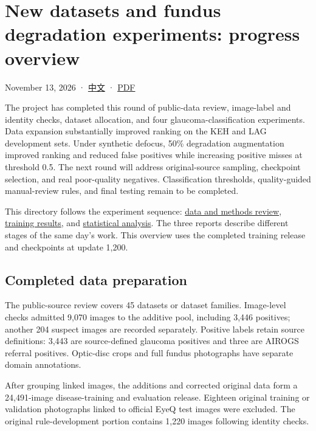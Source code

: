 \documentclass[
  10pt,
]{article}
\author{}
\date{}
\begin{document}
\section{New datasets and fundus degradation experiments: progress
overview}\label{new-datasets-and-fundus-degradation-experiments-progress-overview}

November 13, 2026 · \href{progress-overview.zh.md}{中文} ·
\href{progress-overview.en.pdf}{PDF}

The project has completed this round of public-data review, image-label
and identity checks, dataset allocation, and four
glaucoma-classification experiments. Data expansion substantially
improved ranking on the KEH and LAG development sets. Under synthetic
defocus, 50\% degradation augmentation improved ranking and reduced
false positives while increasing positive misses at threshold 0.5. The
next round will address original-source sampling, checkpoint selection,
and real poor-quality negatives. Classification thresholds,
quality-guided manual-review rules, and final testing remain to be
completed.

This directory follows the experiment sequence:
\href{data-review/data-and-degradation-review.en.md}{data and methods
review}, \href{training-results/training-results.en.md}{training
results}, and
\href{experimental-analysis/experimental-analysis.en.md}{statistical
analysis}. The three reports describe different stages of the same day's
work. This overview uses the completed training release and checkpoints
at update 1,200.

\subsection{Completed data
preparation}\label{completed-data-preparation}

The public-source review covers 45 datasets or dataset families.
Image-level checks admitted 9,070 images to the additive pool, including
3,446 positives; another 204 suspect images are recorded separately.
Positive labels retain source definitions: 3,443 are source-defined
glaucoma positives and three are AIROGS referral positives. Optic-disc
crops and full fundus photographs have separate domain annotations.

After grouping linked images, the additions and corrected original data
form a 24,491-image disease-training and evaluation release. Eighteen
original training or validation photographs linked to official EyeQ test
images were excluded. The original rule-development portion contains
1,220 images following identity checks.
\end{document}

